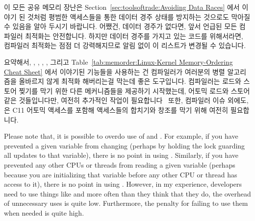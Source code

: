 이 모든 공유 메모리 장난은
Section~\ref{sec:toolsoftrade:Avoiding Data Races} 에서 이야기 된 것처럼 평범한
액세스들을 통한 데이터 경주 상태를 방지하는 것으로도 막아질 수 있음을 알아
두시기 바랍니다.
어쨌건, 데이터 경주가 없다면, 앞서 언급된 모든 컴파일러 최적화는 안전합니다.
하지만 데이터 경주를 가지고 있는 코드를 위해서라면, 컴파일러 최적화는 점점 더
강력해지므로 알림 없이 이 리스트가 변경될 수 있습니다.

요약해서, , , , ,
그리고 Table~\ref{tab:memorder:Linux-Kernel Memory-Ordering Cheat Sheet} 에서
이야기된 기능들을 사용하는 건 컴파일러가 여러분의 병렬 알고리즘을 올바르지 않게
최적화 해버리는걸 막는데 좋은 도구입니다.
컴파일러는 로드와 스토어 찢기를 막기 위한 다른 메커니즘들을 제공하기
시작했는데,  어토믹 로드와 스토어 같은 것들입니다만,
여전히 추가적인 작업이 필요합니다~\cite{JonathanCorbet2016C11atomics}
또한, 컴파일러 이슈 외에도,  은 C11 어토믹 액세스를 포함해
액세스들의 합치기와 창조를 막기 위해 여전히 필요합니다.

Please note that, it is possible to overdo use of  and
.
For example, if you have prevented a given variable from changing
(perhaps by holding the lock guarding all updates to that
variable), there is no point in using .
Similarly, if you have prevented any other CPUs or threads from
reading a given variable (perhaps because you are initializing
that variable before any other CPU or thread has access to it),
there is no point in using .
However, in my experience, developers need to use things like
 and  more often than they think that
they do, the overhead of unnecessary uses is quite low.
Furthermore, the penalty for failing to use them when needed is quite high.

